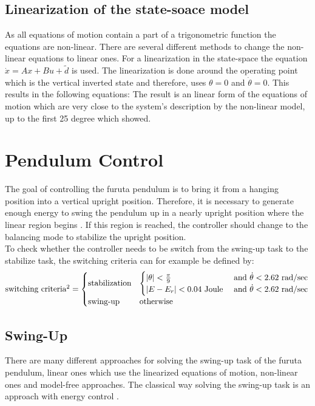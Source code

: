 \subsection{Linearization of the state-soace model}
As all equations of motion contain a part of a trigonometric function the 
equations are non-linear. There are several different methods to change the 
non-linear equations to linear ones. %
 For a linearization in the state-space the equation 
$\dot{x}=Ax+Bu+\tilde{d}$ is used. The linearization is done around the 
operating point \cite{rigatos2018nonlinear} which is the vertical inverted 
state and therefore, uses $\theta = 0$ and $\dot{\theta}=0$. This results in 
the following equations:
The result is an linear form of the equations of motion which are very close to 
the system's description by the non-linear model, up to the first 25 degree 
which \citeauthor{kurode2011swing} showed.

\section{Pendulum Control}
The goal of controlling the furuta pendulum is to bring it from a hanging 
position into a vertical upright position. Therefore, it is necessary to 
generate enough energy to swing the pendulum up in a nearly upright position 
where the linear region begins \cite{kurode2011swing}. If this region is 
reached, the controller should change to the balancing mode to stabilize the 
upright position.\\
To check whether the controller needs to be switch from the swing-up task to 
the stabilize task, the switching criteria can for example be defined by:
\begin{align*}
\text{switching criteria}\footnotemark[2] =
\begin{cases} \text{stabilization} &\begin{cases}
|\theta|< \frac{\pi}{9} \ &\text{and}\  \dot{\theta} < 2.62\  \text{rad/sec}\\
|E-E_r|< 0.04 \ \text{Joule}\ &\text{and}\  \dot{\theta} < 2.62\  \text{rad/sec}
\end{cases}\\
\text{swing-up} & \text{otherwise}
\end{cases}
\end{align*}
\subsection{Swing-Up}
There are many different approaches for solving the swing-up task of the furuta 
pendulum, linear ones which use the linearized equations of motion, non-linear 
ones and model-free approaches. The classical way solving the swing-up task is 
an approach with energy control \cite{seman2013swinging}.
